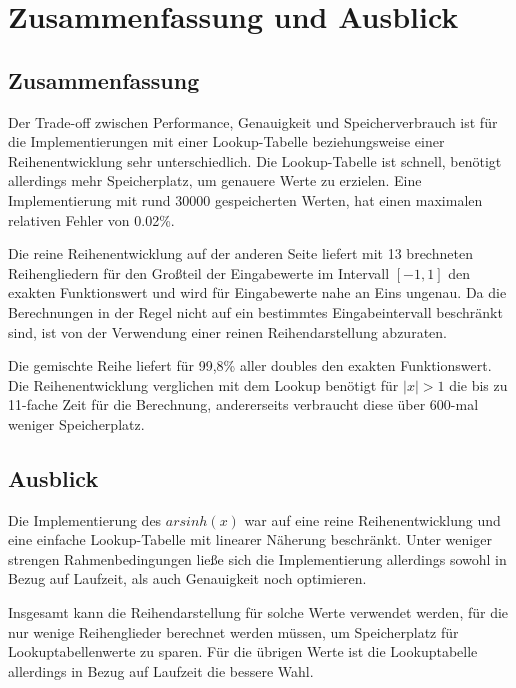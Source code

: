 \documentclass[course=erap] {aspdoc}
\begin{document}
    \section{Zusammenfassung und Ausblick}\label{sec:zusammenfassung-und-ausblick}

    \subsection{Zusammenfassung}\label{subsec:zusammenfassung}

    Der Trade-off zwischen Performance, Genauigkeit und Speicherverbrauch ist für die Implementierungen mit einer Lookup-Tabelle beziehungsweise einer Reihenentwicklung sehr unterschiedlich.
    Die Lookup-Tabelle ist schnell, benötigt allerdings mehr Speicherplatz, um genauere Werte zu erzielen.
    Eine Implementierung mit rund 30000 gespeicherten Werten, hat einen maximalen relativen Fehler von 0.02\%.

    Die reine Reihenentwicklung auf der anderen Seite liefert mit 13 brechneten Reihengliedern für den Großteil der Eingabewerte im Intervall $[-1, 1]$ den exakten Funktionswert und wird für Eingabewerte nahe an Eins ungenau.
    Da die Berechnungen in der Regel nicht auf ein bestimmtes Eingabeintervall beschränkt sind, ist von der Verwendung einer reinen Reihendarstellung abzuraten.
    

    Die gemischte Reihe liefert für 99,8\% aller doubles den exakten Funktionswert.
    Die Reihenentwicklung verglichen mit dem Lookup benötigt für $|x|>1$ die bis zu 11-fache Zeit für die Berechnung, andererseits verbraucht diese über 600-mal weniger Speicherplatz.


    \subsection{Ausblick}\label{subsec:ausblick}

    Die Implementierung des $arsinh(x)$ war auf eine reine Reihenentwicklung und eine einfache Lookup-Tabelle mit linearer Näherung beschränkt.
    Unter weniger strengen Rahmenbedingungen ließe sich die Implementierung allerdings sowohl in Bezug auf Laufzeit, als auch Genauigkeit noch optimieren.

    Insgesamt kann die Reihendarstellung für solche Werte verwendet werden, für die nur wenige Reihenglieder berechnet werden müssen, um Speicherplatz für Lookuptabellenwerte zu sparen. 
    Für die übrigen Werte ist die Lookuptabelle allerdings in Bezug auf Laufzeit die bessere Wahl. 
    
\end{document}
